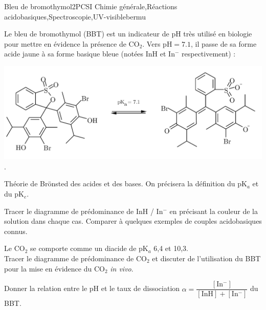 
\begin{exercise}{Bleu de bromothymol}{2}{PCSI}
{Chimie générale,Réactions acidobasiques,Spectroscopie,UV-visible}{bermu}


Le bleu de bromothymol (BBT) est un indicateur de pH très utilisé en biologie pour mettre en évidence la présence de $\mathrm{CO_2}$. Vers $\text{pH} = 7.1$, il passe de sa forme acide jaune à sa forme basique bleue (notées $\mathrm{InH}$ et $\mathrm{In^{-}}$ respectivement) :\vspace{-.5em}
\begin{center}
        \includegraphics[width=.7\linewidth]{chimie/pH/BBT1.pdf}.\vspace{-1.5em}
\end{center}

\begin{questions}
\questioncours Théorie de Brönsted des acides et des bases. On précisera la définition du pK$_a$ et du pK$_e$.

\question Tracer le diagramme de prédominance de InH / In$^-$ en précisant la couleur de la solution dans chaque cas. Comparer à quelques exemples de couples acidobasiques connus.

\question Le CO$_2$ se comporte comme un diacide de pK$_a$ 6,4 et 10,3. \\ Tracer le diagramme de prédominance de CO$_2$ et discuter de l'utilisation du BBT pour la mise en évidence du CO$_2$ \textit{in vivo}.

\question\label{qu:1} Donner la relation entre le pH et le taux de dissociation $\alpha = \dfrac{\mathrm{[In^-]}}{\mathrm{[InH] + [In^-]}}$ du BBT.


\end{questions}
\end{exercise}
